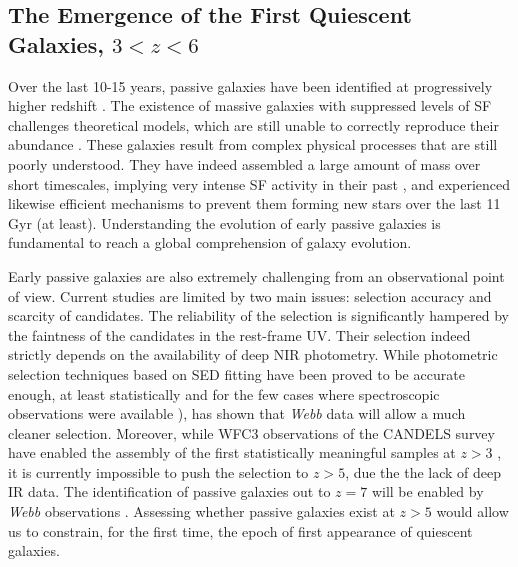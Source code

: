 \documentclass[12pt]{article}
\begin{document}
\subsection*{The Emergence of the First Quiescent Galaxies, $3<z<6$}

Over the last 10-15 years, passive galaxies have been identified at progressively higher redshift \citep[e.g.][]{cimatti04, saracco05, labbe05, kriek06, fontana09, straatman14, nayyeri14, schreiber18, merlin18, merlin19, carnall20, shahidi20}.
The existence of massive galaxies with suppressed levels of SF challenges theoretical models, which are still unable to correctly reproduce their abundance \citep[e.g.][, Santini et al. 2020]{vogelsberger14, feldmann16, merlin19, girelli19, shahidi20}. These galaxies result from complex physical processes that are still poorly understood. They have indeed assembled a large amount of mass over short timescales, implying very intense SF activity in their past \citep[e.g][]{merlin19}, and experienced likewise efficient mechanisms to prevent them forming new stars over the last 11 Gyr (at least). Understanding the evolution of early passive galaxies is fundamental to reach a global comprehension of galaxy evolution.

Early passive galaxies are also extremely challenging from an observational point of view. Current studies are limited by two main issues: selection accuracy and scarcity of candidates. 
The reliability of the selection is significantly hampered by the faintness of the candidates in the rest-frame UV. Their selection indeed strictly depends on the availability of deep NIR photometry. While photometric selection techniques based on SED fitting have been proved to be accurate enough, at least statistically \citep{santini19} and for the few cases where spectroscopic observations were available \citep{carnall20}),\citet{merlin18} has shown that \emph{Webb} data will allow a much cleaner selection. Moreover, while WFC3 observations of the CANDELS survey have enabled the assembly of the first statistically meaningful samples at $z>3$ \citep[e.g.][]{merlin19, carnall20, shahidi20}, it is currently impossible to push the selection to $z>5$, due the the lack of deep IR data. The identification of passive galaxies out to $z=7$ will be enabled by \emph{Webb} observations \citep{merlin19}. Assessing whether passive galaxies exist at $z>5$ would allow us to constrain, for the first time, the epoch of first appearance of quiescent galaxies. 
\end{document}
